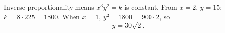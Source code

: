 Inverse proportionality means $x^3y^2=k$ is constant. From $x=2$, $y=15$: $k=8\cdot225=1800$. When $x=1$, $y^2=1800=900\cdot2$, so
\[
y=\boxed{30\sqrt2}.
\]
